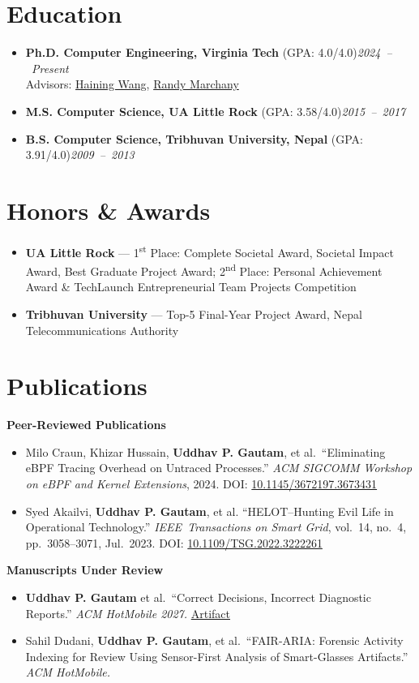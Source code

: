 \documentclass[10pt]{article}
\newcommand{\thread}[1]{%
 \par\needspace{3\baselineskip}\vspace{14pt}%
 {\noindent\fontsize{11}{13}\selectfont\bfseries #1\par}%
}
\newcommand{\cvsection}[1]{\needspace{5\baselineskip}\section*{#1}}
\newcommand{\refsize}{\fontsize{9.5}{11.5}\selectfont}
\begin{document}
\cvsection{Education}
\begin{itemize}
 \item \textbf{Ph.D. Computer Engineering, Virginia Tech} (GPA: 4.0/4.0)\hfill\mbox{\small\itshape 2024 -- Present}\\
 {\small\color{subtextcolor}Advisors: \href{https://ece.vt.edu/people/profile/wangh.html}{Haining Wang}, \href{https://security.vt.edu/about/staff/randy-marchany/}{Randy Marchany}}
 \item \textbf{M.S. Computer Science, UA Little Rock} (GPA: 3.58/4.0)\hfill\mbox{\small\itshape 2015 -- 2017}
 \item \textbf{B.S. Computer Science, Tribhuvan University, Nepal} (GPA: 3.91/4.0)\hfill\mbox{\small\itshape 2009 -- 2013}
\end{itemize}

\cvsection{Honors \& Awards}
\begin{itemize}
 \item \textbf{UA Little Rock} --- 1\textsuperscript{st} Place: Complete Societal Award, Societal Impact Award, Best
 Graduate Project Award; 2\textsuperscript{nd} Place: Personal Achievement Award \& TechLaunch Entrepreneurial Team
 Projects Competition
 \item \textbf{Tribhuvan University} --- Top-5 Final-Year Project Award, Nepal Telecommunications Authority
\end{itemize}

\cvsection{Publications}
\thread{Peer-Reviewed Publications}
\begin{itemize}\refsize
 \item Milo Craun, Khizar Hussain, \textbf{Uddhav P. Gautam},
 et al.\ ``Eliminating eBPF Tracing Overhead
 on Untraced Processes.'' \textit{ACM SIGCOMM Workshop on eBPF and Kernel Extensions}, 2024.
 DOI: \href{https://doi.org/10.1145/3672197.3673431}{10.1145/3672197.3673431}
 \item Syed Akailvi, \textbf{Uddhav P. Gautam}, et al.
 ``HELOT--Hunting Evil Life in Operational Technology.''
 \textit{IEEE~Transactions on Smart Grid}, vol.~14, no.~4, pp.~3058--3071, Jul.~2023.
 DOI: \href{https://doi.org/10.1109/TSG.2022.3222261}{10.1109/TSG.2022.3222261}
\end{itemize}

\thread{Manuscripts Under Review}
\begin{itemize}\refsize
 \item \textbf{Uddhav P. Gautam} et al.\ ``Correct Decisions, Incorrect Diagnostic Reports.''
 \textit{ACM HotMobile 2027.} \href{https://github.com/rgrinnovatellc/CorrectDecisions}{Artifact}
 \item Sahil Dudani, \textbf{Uddhav P. Gautam}, et al.\ ``FAIR-ARIA: Forensic Activity Indexing for
 Review Using Sensor-First Analysis of Smart-Glasses Artifacts.'' \textit{ACM HotMobile.}
\end{itemize}
\end{document}
